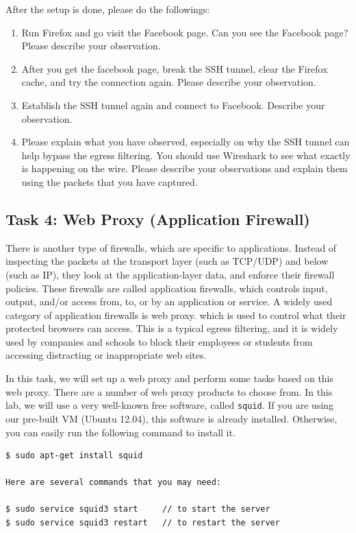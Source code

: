 After the setup is done, please do the followings:
\begin{enumerate}
\item Run Firefox and go visit the Facebook page.
Can you see the Facebook page? 
Please describe your observation. 

\item After you get the facebook page, break the SSH tunnel, 
clear the Firefox cache, and try the connection again. 
Please describe your observation. 

\item Establish the SSH tunnel again and connect to Facebook. 
Describe your observation. 

\item Please explain what you have observed, especially
on why the SSH tunnel can help bypass the egress filtering. 
You should use Wireshark to see
what exactly is happening on the wire. Please describe your 
observations and explain them using the packets that you
have captured.
\end{enumerate}




\subsection{Task 4: Web Proxy (Application Firewall)}


There is another type of firewalls, which are specific to 
applications. Instead of inspecting the packets at 
the transport layer (such as TCP/UDP) and below (such as IP), 
they look at the application-layer data, and enforce 
their firewall policies. These firewalls are called 
application firewalls,  which controls input, output,
and/or access from, to, or by an application or service.
A widely used category of application firewalls is web proxy. 
which is used to control what their protected browsers can
access. This is a typical egress filtering, and it is widely
used by companies and schools to block their employees 
or students from accessing distracting or inappropriate 
web sites. 


In this task, we will set up a web proxy and perform some 
tasks based on this web proxy. There are a number of 
web proxy products to choose from. In this lab, we will 
use a very well-known free software, called {\tt squid}. If you 
are using our pre-built VM (Ubuntu 12.04), this software is already installed. 
Otherwise, you can easily run the following command to 
install it.
\begin{Verbatim}[frame=single] 
$ sudo apt-get install squid

Here are several commands that you may need:

$ sudo service squid3 start     // to start the server
$ sudo service squid3 restart   // to restart the server
\end{Verbatim}


